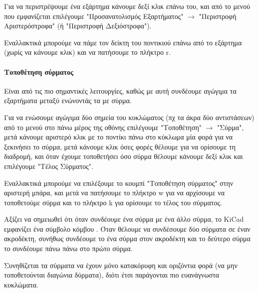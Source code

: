 \documentclass[a4paper]{article}
\begin{document}
Για να περιστρέψουμε ένα εξάρτημα κάνουμε δεξί κλικ επάνω του, και από το μενού που εμφανίζεται επιλέγουμε "Προσανατολισμός Εξαρτήματος" $\rightarrow$ "Περιστροφή Αριστερόστροφα" (ή "Περιστροφή Δεξιόστροφα"). 

Εναλλακτικά μπορούμε να πάμε τον δείκτη του ποντικιού επάνω από το εξάρτημα (χωρίς να κάνουμε κλικ) και να πατήσουμε το πλήκτρο r.

\paragraph{Τοποθέτηση σύρματος}
Είναι από τις πιο σημαντικές λειτουργίες, καθώς με αυτή συνδέουμε αγώγιμα τα εξαρτήματα μεταξύ ενώνοντάς τα με σύρμα.

Για να ενώσουμε αγώγιμα δύο σημεία του κυκλώματος (πχ τα άκρα δύο αντιστάσεων) από το μενού στο πάνω μέρος της οθόνης επιλέγουμε "Τοποθέτηση" $\rightarrow$ "Σύρμα", μετά κάνουμε αριστερό κλικ με το ποντίκι πάνω στο κύκλωμα μία φορά για να ξεκινήσει το σύρμα, μετά κάνουμε κλικ όσες φορές θέλουμε για να ορίσουμε τη διαδρομή, και όταν έχουμε τοποθετήσει όσο σύρμα θέλουμε κάνουμε δεξί κλικ και επιλέγουμε "Τέλος Σύρματος". 

Εναλλακτικά μπορούμε να επιλέξουμε το κουμπί "Τοποθέτηση σύρματος" %
στην αριστερή μπάρα, και μετά να πατήσουμε το πλήκτρο w για να αρχίσουμε να τοποθετούμε σύρμα και το πλήκτρο k για ορίσουμε το τέλος του σύρματος.

Αξίζει να σημειωθεί ότι όταν συνδέουμε ένα σύρμα με ένα άλλο σύρμα, το \textenglish{KiCad} εμφανίζει ένα σύμβολο κόμβου %
. Όταν θέλουμε να συνδέσουμε δύο σύρματα σε έναν ακροδέκτη, συνήθως συνδέουμε το ένα σύρμα στον ακροδέκτη και το δεύτερο σύρμα το συνδέουμε πάνω πάνω στο πρώτο σύρμα.

Συνηθίζεται τα σύρματα να έχουν μόνο κατακόρυφη και οριζόντια φορά (να μην τοποθετούνται διαγώνια δύρματα), διότι έτσι παράγονται πιο ευανάγνωστα κυκλώματα.

\begin{figure}
  \begin{center}
    \label{fig:kicad-main}
  \end{center}
\end{figure}

\begin{figure}
  \begin{center}
    \label{fig:kicad-main}
  \end{center}
\end{figure}
   
\end{document}
